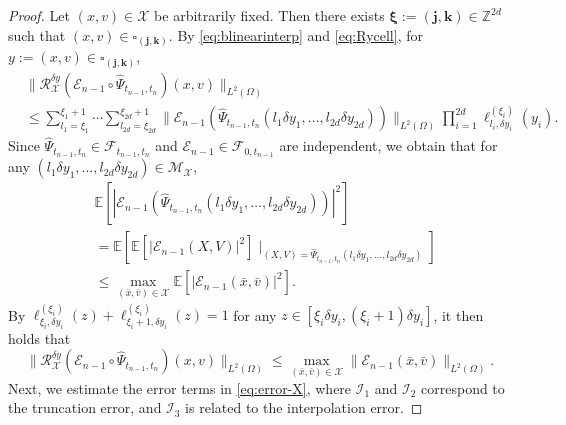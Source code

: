 \documentclass[11pt,reqno]{amsproc}
\numberwithin{equation}{section}
\newcommand{\E}{\mathbb{E}}\allowdisplaybreaks[4]
\begin{document}
\begin{proof}
Let $(x,v)\in\mathscr{X}$ be arbitrarily fixed. 
Then there exists $\boldsymbol\xi:=(\mathbf{j},\mathbf{k})\in\mathbb{Z}^{2d}$ such that $(x,v)\in\square_{(\mathbf{j},\mathbf{k})}$.
By \eqref{eq:blinearinterp} and \eqref{eq:Rycell},
for $y:=(x,v)\in\square_{(\mathbf{j},\mathbf{k})}$,
\begin{align*}
&\|\mathscr{R}_{\mathscr{X}}^{\delta y}(\mathcal{E}_{n-1}\circ\widehat{\Psi}_{t_{n-1},t_n})(x,v)\|_{L^2(\Omega)}\\
&\le\sum_{l_1=\xi_1}^{\xi_1+1}\cdots\sum_{l_{2d}=\xi_{2d}}^{\xi_{2d}+1}\|\mathcal{E}_{n-1}(\widehat{\Psi}_{t_{n-1},t_n}(l_1\delta y_1,\ldots,l_{2d}\delta y_{2d}))\|_{L^2(\Omega)}\prod_{i=1}^{2d}\ell^{(\xi_i)}_{l_i,\delta y_i}(y_i).
\end{align*}
Since $\widehat{\Psi}_{t_{n-1},t_n}\in\mathscr{F}_{t_{n-1},t_n}$ and $\mathcal{E}_{n-1}\in\mathscr{F}_{0,t_{n-1}}$ are independent, we obtain that for any $(l_1\delta y_1,\ldots,l_{2d}\delta y_{2d})\in\mathcal M_{\mathscr{X}}$,
\begin{align*}
&\E\left[|\mathcal{E}_{n-1}(\widehat{\Psi}_{t_{n-1},t_n}(l_1\delta y_1,\ldots,l_{2d}\delta y_{2d}))|^2\right]\\
&=\E\left[\E\left[|\mathcal{E}_{n-1}(X,V)|^2\right]\mid_{(X,V)=\widehat{\Psi}_{t_{n-1},t_n}(l_1\delta y_1,\ldots,l_{2d}\delta y_{2d})} \right]\\
& \le
\max_{(\bar{x},\bar{v})\in\mathscr{X}}\E\left[|\mathcal{E}_{n-1}(\bar{x},\bar{v})|^2\right].
\end{align*}
By
$\ell^{(\xi_i)}_{\xi_i,\delta y_i}(z)+\ell^{(\xi_i)}_{\xi_i+1,\delta y_i}(z)=1$ for any $z\in[\xi_i\delta y_i,(\xi_i+1)\delta y_i]$, it then holds that 
\begin{equation}\label{eq:En-1}
\|\mathscr{R}_{\mathscr{X}}^{\delta y}(\mathcal{E}_{n-1}\circ\widehat{\Psi}_{t_{n-1},t_n})(x,v)\|_{L^2(\Omega)}\le\max_{(\bar{x},\bar{v})\in\mathscr{X}}\|\mathcal{E}_{n-1}(\bar{x},\bar{v})\|_{L^2(\Omega)}.
\end{equation}
Next, we estimate the error terms in \eqref{eq:error-X}, where $\mathcal{I}_1$ and $\mathcal{I}_2$ correspond to the truncation error, and  $\mathcal{I}_3$ is related to the interpolation error.



\end{proof}
\end{document}
